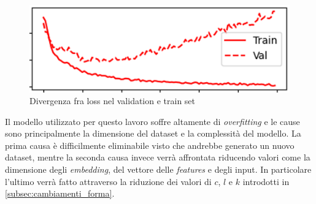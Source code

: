     \begin{figure}[h]
        \centering
        \includegraphics[scale=0.55]{images/LossOverfitting.png}
        \caption{Divergenza fra loss nel validation e train set}
        \label{fig:overfitting_grafo_divergenza}
    \end{figure}
Il modello utilizzato per questo lavoro soffre altamente di \textit{overfitting} e le cause sono principalmente la dimensione del dataset e la complessità del modello.
La prima causa è difficilmente eliminabile visto che andrebbe generato un nuovo dataset, mentre la seconda causa invece verrà affrontata riducendo valori come la dimensione degli \textit{embedding}, del vettore delle \textit{features} e degli input.
In particolare l'ultimo verrà fatto attraverso la riduzione dei valori di $c$, $l$ e $k$ introdotti in \autoref{subsec:cambiamenti_forma}.


